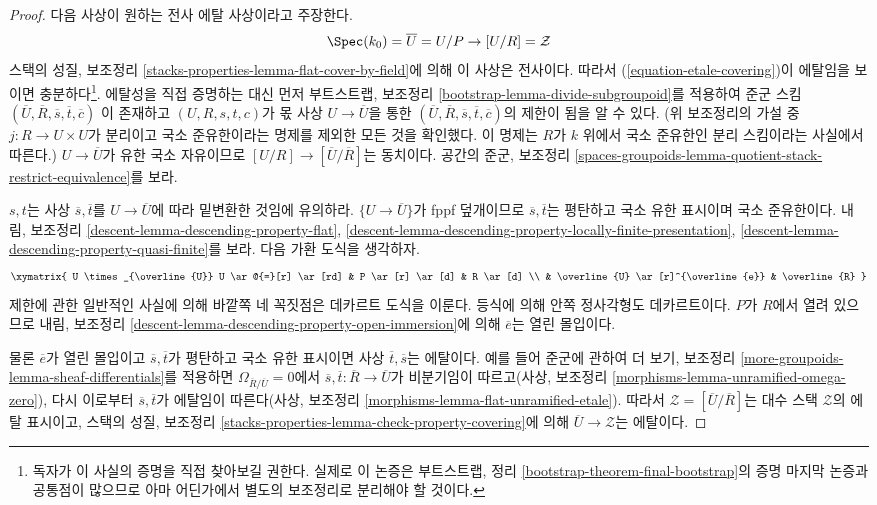\begin{proof}
\medskip\noindent
다음 사상이 원하는 전사 에탈 사상이라고 주장한다.
\begin{equation}
\label{equation-etale-covering}
\Spec(k_0) = \overline{U} = U/P \to [U/R] = \mathcal{Z}
\end{equation}
스택의 성질, 보조정리
\ref{stacks-properties-lemma-flat-cover-by-field}에 의해 이 사상은
전사이다. 따라서 (\ref{equation-etale-covering})이
에탈임을 보이면 충분하다\footnote{독자가 이 사실의 증명을 직접 찾아보길
권한다. 실제로 이 논증은 부트스트랩, 정리
\ref{bootstrap-theorem-final-bootstrap}의 증명 마지막 논증과 공통점이
많으므로 아마 어딘가에서 별도의 보조정리로 분리해야 할 것이다.}.
에탈성을 직접 증명하는 대신 먼저 부트스트랩, 보조정리
\ref{bootstrap-lemma-divide-subgroupoid}를 적용하여 준군 스킴
$(\overline{U}, \overline{R}, \overline{s}, \overline{t}, \overline{c})$
이 존재하고 $(U, R, s, t, c)$가 몫 사상 $U \to \overline{U}$을 통한
$(\overline{U}, \overline{R}, \overline{s}, \overline{t}, \overline{c})$의
제한이 됨을 알 수 있다. (위 보조정리의 가설 중
$j : R \to U \times U$가 분리이고 국소 준유한이라는 명제를 제외한
모든 것을 확인했다. 이 명제는 $R$가 $k$ 위에서 국소 준유한인 분리
스킴이라는 사실에서 따른다.) $U \to \overline{U}$가 유한 국소
자유이므로 $[U/R] \to [\overline{U}/\overline{R}]$는 동치이다.
공간의 준군, 보조정리
\ref{spaces-groupoids-lemma-quotient-stack-restrict-equivalence}를 보라.

\medskip\noindent
$s, t$는 사상 $\overline{s}, \overline{t}$를
$U \to \overline{U}$에 따라 밑변환한 것임에 유의하라.
$\{U \to \overline{U}\}$가 fppf 덮개이므로
$\overline{s}, \overline{t}$는 평탄하고 국소 유한 표시이며 국소
준유한이다. 내림, 보조정리
\ref{descent-lemma-descending-property-flat},
\ref{descent-lemma-descending-property-locally-finite-presentation},
\ref{descent-lemma-descending-property-quasi-finite}를 보라.
다음 가환 도식을 생각하자.
$$
\xymatrix{
U \times_{\overline{U}} U \ar@{=}[r] \ar[rd] & P \ar[r] \ar[d] & R \ar[d] \\
& \overline{U} \ar[r]^{\overline{e}} & \overline{R}
}
$$
제한에 관한 일반적인 사실에 의해 바깥쪽 네 꼭짓점은 데카르트 도식을
이룬다. 등식에 의해 안쪽 정사각형도 데카르트이다. $P$가 $R$에서
열려 있으므로 내림, 보조정리
\ref{descent-lemma-descending-property-open-immersion}에 의해
$\overline{e}$는 열린 몰입이다.

\medskip\noindent
물론 $\overline{e}$가 열린 몰입이고
$\overline{s}, \overline{t}$가 평탄하고 국소 유한 표시이면 사상
$\overline{t}, \overline{s}$는 에탈이다. 예를 들어 준군에 관하여 더
보기, 보조정리 \ref{more-groupoids-lemma-sheaf-differentials}를 적용하면
$\Omega_{\overline{R}/\overline{U}} = 0$에서
$\overline{s}, \overline{t} : \overline{R} \to \overline{U}$가 비분기임이
따르고(사상, 보조정리 \ref{morphisms-lemma-unramified-omega-zero}),
다시 이로부터 $\overline{s}, \overline{t}$가 에탈임이 따른다(사상,
보조정리 \ref{morphisms-lemma-flat-unramified-etale}).
따라서 $\mathcal{Z} = [\overline{U}/\overline{R}]$는 대수 스택
$\mathcal{Z}$의 에탈 표시이고, 스택의 성질, 보조정리
\ref{stacks-properties-lemma-check-property-covering}에 의해
$\overline{U} \to \mathcal{Z}$는 에탈이다.
\end{proof}

